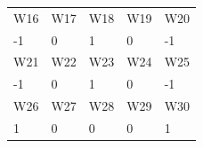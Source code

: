 \documentclass[11pt]{article}
\begin{document}
\begin{table}[h]
\begin{tabular}{lllll}
  \rowcolor[HTML]{000000}
  {\color[HTML]{FFFFFF} W16}                        & {\color[HTML]{FFFFFF} W17} & {\color[HTML]{FFFFFF} W18} & {\color[HTML]{FFFFFF} W19} & {\color[HTML]{FFFFFF} W20} \\
  -1                                                & 0                          & 1                          & 0                          & -1                         \\
  \rowcolor[HTML]{000000}
  {\color[HTML]{FFFFFF} W21}                        & {\color[HTML]{FFFFFF} W22} & {\color[HTML]{FFFFFF} W23} & {\color[HTML]{FFFFFF} W24} & {\color[HTML]{FFFFFF} W25} \\
  -1                                                & 0                          & 1                          & 0                          & -1                         \\
  \rowcolor[HTML]{000000}
  {\color[HTML]{FFFFFF} W26}                        & {\color[HTML]{FFFFFF} W27} & {\color[HTML]{FFFFFF} W28} & {\color[HTML]{FFFFFF} W29} & {\color[HTML]{FFFFFF} W30} \\
  1                                                 & 0                          & 0                          & 0                          & 1
  \end{tabular}
\end{table}
\end{document}
